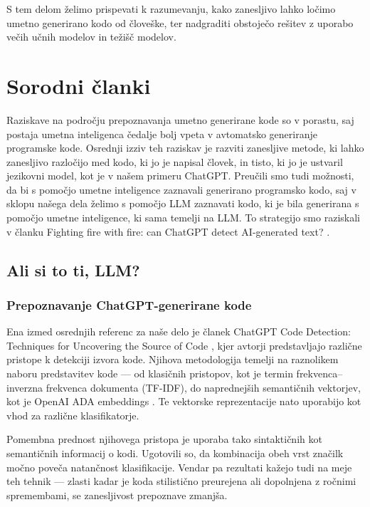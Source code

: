 \documentclass[sigconf,nonacm]{acmart}
\begin{document}
S tem delom želimo prispevati k razumevanju, kako zanesljivo lahko ločimo umetno generirano kodo od človeške, ter nadgraditi obstoječo rešitev z uporabo večih učnih modelov in težišč modelov.

\section{Sorodni članki}
Raziskave na področju prepoznavanja umetno generirane kode so v porastu, saj postaja umetna inteligenca čedalje bolj vpeta v avtomatsko generiranje programske kode. Osrednji izziv teh raziskav je razviti zanesljive metode, ki lahko zanesljivo razločijo med kodo, ki jo je napisal človek, in tisto, ki jo je ustvaril jezikovni model, kot je v našem primeru ChatGPT. 
Preučili smo tudi možnosti, da bi s pomočjo umetne inteligence zaznavali generirano programsko kodo, saj v sklopu našega dela želimo s pomočjo \acrshort{LLM} zaznavati kodo, ki je bila generirana s pomočjo umetne inteligence, ki sama temelji na \acrshort{LLM}. To strategijo smo raziskali v članku Fighting fire with fire: can ChatGPT detect AI-generated text? \cite{bhattacharjee2024fighting}.

\subsection{Ali si to ti, LLM?}
\subsubsection{Prepoznavanje ChatGPT-generirane kode}
Ena izmed osrednjih referenc za naše delo je članek ChatGPT Code Detection: Techniques for Uncovering the Source of Code \cite{oedingen2024chatgpt}, kjer avtorji predstavljajo različne pristope k detekciji izvora kode. Njihova metodologija temelji na raznolikem naboru predstavitev kode — od klasičnih pristopov, kot je termin frekvenca–inverzna frekvenca dokumenta (\acrshort{TF-IDF}), do naprednejših semantičnih vektorjev, kot je OpenAI ADA embeddings \cite{goel2024using}. Te vektorske reprezentacije nato uporabijo kot vhod za različne klasifikatorje.

Pomembna prednost njihovega pristopa je uporaba tako sintaktičnih kot semantičnih informacij o kodi. Ugotovili so, da kombinacija obeh vrst značilk močno poveča natančnost klasifikacije. Vendar pa rezultati kažejo tudi na meje teh tehnik — zlasti kadar je koda stilistično preurejena ali dopolnjena z ročnimi spremembami, se zanesljivost prepoznave zmanjša.
\end{document}
